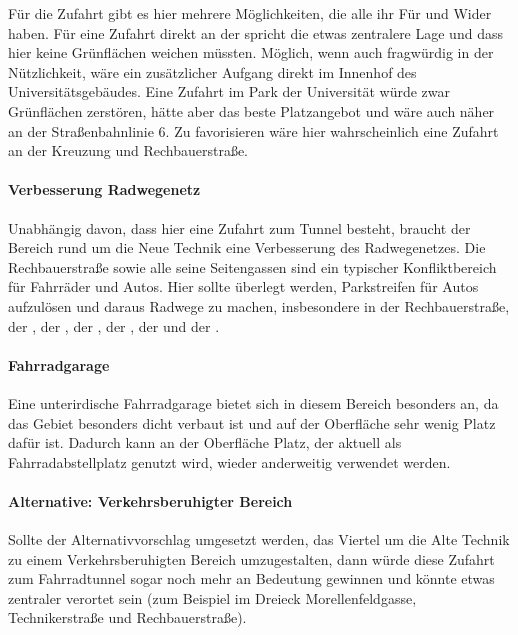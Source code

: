 Für die Zufahrt gibt es hier mehrere Möglichkeiten, die alle ihr Für und Wider haben. Für eine Zufahrt direkt an der  spricht die etwas zentralere Lage und dass hier keine Grünflächen weichen müssten. Möglich, wenn auch fragwürdig in der Nützlichkeit, wäre ein zusätzlicher Aufgang direkt im Innenhof des Universitätsgebäudes. Eine Zufahrt im Park der Universität würde zwar Grünflächen zerstören, hätte aber das beste Platzangebot und wäre auch näher an der Straßenbahnlinie 6. Zu favorisieren wäre hier wahrscheinlich eine Zufahrt an der Kreuzung  und Rechbauerstraße.

\paragraph{Verbesserung Radwegenetz}
Unabhängig davon, dass hier eine Zufahrt zum Tunnel besteht, braucht der Bereich rund um die Neue Technik eine Verbesserung des Radwegenetzes. Die Rechbauerstraße sowie alle seine Seitengassen sind ein typischer Konfliktbereich für Fahrräder und Autos. Hier sollte überlegt werden, Parkstreifen für Autos aufzulösen und daraus Radwege zu machen, insbesondere in der Rechbauerstraße, der , der , der , der , der  und der .

\paragraph{Fahrradgarage}
Eine unterirdische Fahrradgarage bietet sich in diesem Bereich besonders an, da das Gebiet besonders dicht verbaut ist und auf der Oberfläche sehr wenig Platz dafür ist. Dadurch kann an der Oberfläche Platz, der aktuell als Fahrradabstellplatz genutzt wird, wieder anderweitig verwendet werden.

\paragraph{Alternative: Verkehrsberuhigter Bereich}
Sollte der Alternativvorschlag umgesetzt werden, das Viertel um die Alte Technik zu einem Verkehrsberuhigten Bereich umzugestalten, dann würde diese Zufahrt zum Fahrradtunnel sogar noch mehr an Bedeutung gewinnen und könnte etwas zentraler verortet sein (zum Beispiel im Dreieck Morellenfeldgasse, Technikerstraße und Rechbauerstraße). %

